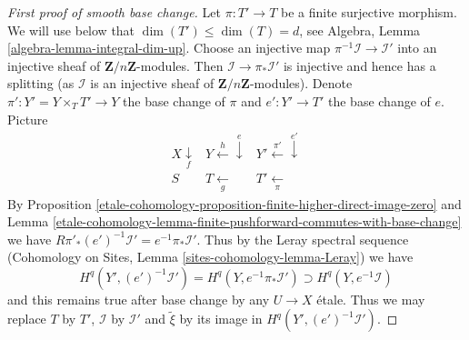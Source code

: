 \begin{proof}[First proof of smooth base change]
\medskip\noindent
Let $\pi : T' \to T$ be a finite surjective morphism.
We will use below that $\dim(T') \leq \dim(T) = d$, see
Algebra, Lemma \ref{algebra-lemma-integral-dim-up}.
Choose an injective map $\pi^{-1}\mathcal{I} \to \mathcal{I}'$
into an injective sheaf of $\mathbf{Z}/n\mathbf{Z}$-modules.
Then $\mathcal{I} \to \pi_*\mathcal{I}'$ is injective
and hence has a splitting (as $\mathcal{I}$ is an injective
sheaf of $\mathbf{Z}/n\mathbf{Z}$-modules).
Denote $\pi' : Y' = Y \times_T T' \to Y$ the base change of $\pi$
and $e' : Y' \to T'$ the base change of $e$. Picture
$$
\begin{array}{ccc}X \underset{f}{\downarrow} & Y \overset{h}{\longleftarrow}\overset{e}{\downarrow} & Y' \overset{\pi'}{\longleftarrow}\overset{e'}{\downarrow} \\ S & T \underset{g}{\longleftarrow} & T' \underset{\pi}{\longleftarrow}\end{array}
$$
By Proposition \ref{etale-cohomology-proposition-finite-higher-direct-image-zero} and
Lemma \ref{etale-cohomology-lemma-finite-pushforward-commutes-with-base-change} we have
$R\pi'_*(e')^{-1}\mathcal{I}' = e^{-1}\pi_*\mathcal{I}'$.
Thus by the Leray spectral sequence
(Cohomology on Sites, Lemma \ref{sites-cohomology-lemma-Leray})
we have
$$
H^q(Y', (e')^{-1}\mathcal{I}') =
H^q(Y, e^{-1}\pi_*\mathcal{I}') \supset H^q(Y, e^{-1}\mathcal{I})
$$
and this remains true after base change by any $U \to X$ \'etale.
Thus we may replace $T$ by $T'$, $\mathcal{I}$ by $\mathcal{I}'$
and $\tilde \xi$ by its image in $H^q(Y', (e')^{-1}\mathcal{I}')$.


\end{proof}
